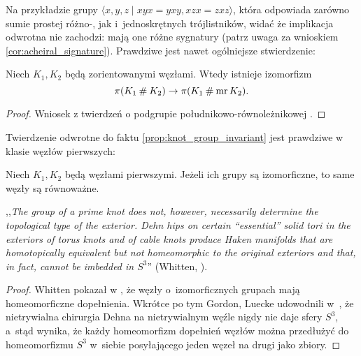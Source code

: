 Na przykładzie grupy $\langle x,y,z \mid xyx=yxy,xzx=zxz\rangle$, która odpowiada zarówno sumie prostej różno-, jak i~jednoskrętnych trójlistników, widać że implikacja odwrotna nie zachodzi: mają one różne sygnatury (patrz uwaga za wnioskiem \ref{cor:acheiral_signature}).
Prawdziwe jest nawet ogólniejsze stwierdzenie:

\begin{proposition}
    Niech $K_1, K_2$ będą zorientowanymi węzłami.
    Wtedy istnieje izomorfizm
    \begin{equation}
        \pi(K_1 \mathbin{\#} K_2) \to \pi(K_1 \mathbin{\#} \operatorname{mr} K_2).
    \end{equation}
\end{proposition}

\begin{proof}
    Wniosek z twierdzeń o podgrupie południkowo-równoleżnikowej \cite[s. 75]{kawauchi1996}.
\end{proof}

Twierdzenie odwrotne do faktu \ref{prop:knot_group_invariant} jest prawdziwe w klasie węzłów pierwszych:

\begin{proposition}
    Niech $K_1, K_2$ będą węzłami pierwszymi.
    Jeżeli ich grupy są izomorficzne, to same węzły są równoważne.
\end{proposition}

,,\emph{The group of a prime knot does not, however, necessarily determine the topological type of the exterior. Dehn hips on certain “essential” solid tori in the exteriors of torus knots and of cable knots produce Haken manifolds that are homotopically equivalent but not homeomorphic to the original exteriors and that, in fact, cannot be imbedded in $S^3$}'' (Whitten, \cite{whitten1987}).
%

\begin{proof}
%
%
%
    Whitten pokazał w \cite{whitten1987}, że węzły o~izomorficznych grupach mają homeomorficzne dopełnienia.
    Wkrótce po tym Gordon, Luecke udowodnili w~\cite{gordon1989}, że nietrywialna chirurgia Dehna na nietrywialnym węźle nigdy nie daje sfery $S^3$, a~stąd wynika, że każdy homeomorfizm dopełnień węzłów można przedłużyć do homeomorfizmu $S^3$ w~siebie posyłającego jeden węzeł na drugi jako zbiory.
%
\end{proof}


